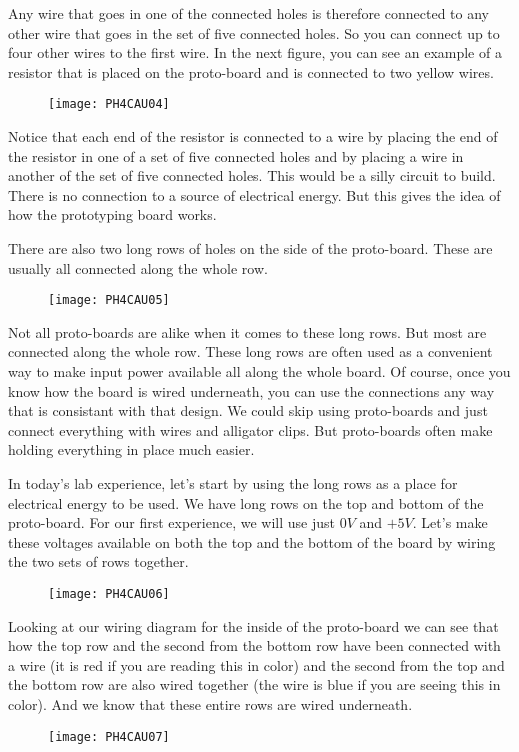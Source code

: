Any wire that goes in one of the
connected holes is therefore connected to any other wire that goes in the
set of five connected holes. So you can connect up to four other wires to
the first wire. In the next figure, you can see an example of a resistor
that is placed on the proto-board and is connected to two yellow wires. 

\begin{figure}[h!]
	\centering
	\texttt{[image: PH4CAU04]}
\end{figure}

Notice that each end of the
resistor is connected to a wire by placing the end of the resistor in one of
a set of five connected holes and by placing a wire in another of the set of
five connected holes. This would be a silly circuit to build. There is no
connection to a source of electrical energy. But this gives the idea of how
the prototyping board works.

There are also two long rows of holes on the side of the proto-board. These
are usually all connected along the whole row. 

\begin{figure}[h!]
	\centering
	\texttt{[image: PH4CAU05]}
\end{figure}

Not all proto-boards are alike
when it comes to these long rows. But most are connected along the whole
row. These long rows are often used as a convenient way to make input power
available all along the whole board. Of course, once you know how the board
is wired underneath, you can use the connections any way that is consistant
with that design. We could skip using proto-boards and just connect
everything with wires and alligator clips. But proto-boards often make
holding everything in place much easier.

In today's lab experience, let's start by using the long rows as a place for
electrical energy to be used. We have long rows on the top and bottom of the
proto-board. For our first experience, we will use just $0\unit{V}$ and $+5%
\unit{V}.$ Let's make these voltages available on both the top and the
bottom of the board by wiring the two sets of rows together. 

\begin{figure}[h!]
	\centering
	\texttt{[image: PH4CAU06]}
\end{figure}

Looking at our wiring diagram for the inside of the proto-board we can see
that how the top row and the second from the bottom row have been connected
with a wire (it is red if you are reading this in color) and the second from
the top and the bottom row are also wired together (the wire is blue if you
are seeing this in color). And we know that these entire rows are wired
underneath. 
\begin{figure}[h!]
	\centering
	\texttt{[image: PH4CAU07]}
\end{figure}

